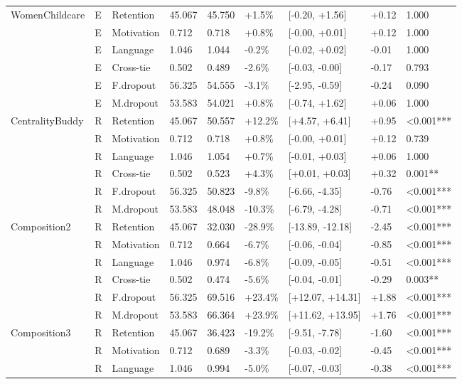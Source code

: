 \begin{longtable}[t]{lllllllll}
\midrule
WomenChildcare & E & Retention & 45.067 & 45.750 & +1.5\% & [-0.20, +1.56] & +0.12 & 1.000\\
  & E & Motivation & 0.712 & 0.718 & +0.8\% & [-0.00, +0.01] & +0.12 & 1.000\\
  & E & Language & 1.046 & 1.044 & -0.2\% & [-0.02, +0.02] & -0.01 & 1.000\\
  & E & Cross-tie & 0.502 & 0.489 & -2.6\% & [-0.03, -0.00] & -0.17 & 0.793\\
  & E & F.dropout & 56.325 & 54.555 & -3.1\% & [-2.95, -0.59] & -0.24 & 0.090\\
  & E & M.dropout & 53.583 & 54.021 & +0.8\% & [-0.74, +1.62] & +0.06 & 1.000\\
\midrule
CentralityBuddy & R & Retention & 45.067 & 50.557 & +12.2\% & [+4.57, +6.41] & +0.95 & <0.001***\\
  & R & Motivation & 0.712 & 0.718 & +0.8\% & [-0.00, +0.01] & +0.12 & 0.739\\
  & R & Language & 1.046 & 1.054 & +0.7\% & [-0.01, +0.03] & +0.06 & 1.000\\
  & R & Cross-tie & 0.502 & 0.523 & +4.3\% & [+0.01, +0.03] & +0.32 & 0.001**\\
  & R & F.dropout & 56.325 & 50.823 & -9.8\% & [-6.66, -4.35] & -0.76 & <0.001***\\
  & R & M.dropout & 53.583 & 48.048 & -10.3\% & [-6.79, -4.28] & -0.71 & <0.001***\\
\midrule
Composition2 & R & Retention & 45.067 & 32.030 & -28.9\% & [-13.89, -12.18] & -2.45 & <0.001***\\
  & R & Motivation & 0.712 & 0.664 & -6.7\% & [-0.06, -0.04] & -0.85 & <0.001***\\
  & R & Language & 1.046 & 0.974 & -6.8\% & [-0.09, -0.05] & -0.51 & <0.001***\\
  & R & Cross-tie & 0.502 & 0.474 & -5.6\% & [-0.04, -0.01] & -0.29 & 0.003**\\
  & R & F.dropout & 56.325 & 69.516 & +23.4\% & [+12.07, +14.31] & +1.88 & <0.001***\\
  & R & M.dropout & 53.583 & 66.364 & +23.9\% & [+11.62, +13.95] & +1.76 & <0.001***\\
\midrule
Composition3 & R & Retention & 45.067 & 36.423 & -19.2\% & [-9.51, -7.78] & -1.60 & <0.001***\\
  & R & Motivation & 0.712 & 0.689 & -3.3\% & [-0.03, -0.02] & -0.45 & <0.001***\\
  & R & Language & 1.046 & 0.994 & -5.0\% & [-0.07, -0.03] & -0.38 & <0.001***\\

\end{longtable}
